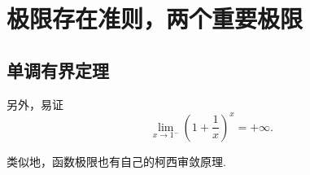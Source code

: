 \section{极限存在准则，两个重要极限}
\subsection{单调有界定理}

另外，易证\begin{equation*}
\lim_{x\to1^-} \left(1+\frac1x\right)^x = +\infty.
\end{equation*}

类似地，函数极限也有自己的柯西审敛原理.
